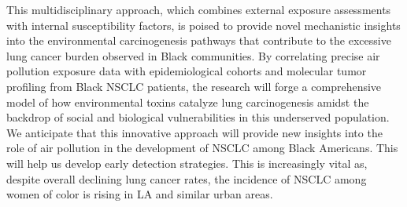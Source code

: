 \vspace{1em}
\noindent
This multidisciplinary approach, which combines external exposure assessments with internal susceptibility factors, 
is poised to provide novel mechanistic insights into the environmental carcinogenesis pathways 
that contribute to the excessive lung cancer burden observed in Black communities. 
By correlating precise air pollution exposure data with epidemiological cohorts and molecular tumor profiling from Black NSCLC patients, 
the research will forge a comprehensive model of how environmental toxins catalyze lung carcinogenesis 
amidst the backdrop of social and biological vulnerabilities in this underserved population. 
We anticipate that this innovative approach will provide new insights into the role of air pollution in 
the development of NSCLC among Black Americans. 
This will help us develop early detection strategies.
This is increasingly vital as, despite overall declining lung cancer rates, 
the incidence of NSCLC among women of color is rising in LA and similar urban areas.
